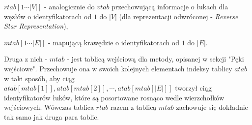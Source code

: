 \begin{myitemize}
	\item $rtab \left[ 1 \cdots \left| V \right| \right] $ - analogicznie do $vtab$ przechowującą informacje o łukach dla węzłów o identyfikatorach od $1$ do $ \left| V \right| $ (dla reprezentacji odwróconej - \textit{Reverse Star Representation}),
	\item $mtab \left[ 1 \cdots \left| E \right| \right] $ - mapującą krawędzie o identyfikatorach od $1$ do $ \left| E \right| $.
\end{myitemize}

Druga z nich - $mtab$ - jest tablicą wejściową dla metody, opisanej w sekcji "Pęki wejściowe". Przechowuje ona w swoich kolejnych elementach indeksy tablicy $atab$ w taki sposób, aby ciąg \\ $atab \left[ mtab \left[ 1 \right] \right], atab \left[ mtab \left[ 2 \right] \right], \cdots, atab \left[ mtab \left[ \left| E \right| \right] \right] $ tworzył ciąg identyfikatorów łuków, które są posortowane rosnąco wedle wierzchołków wejściowych. Wówczas tablica $rtab$ razem z tablicą $mtab$ zachowuje się dokładnie tak samo jak druga para tablic.

